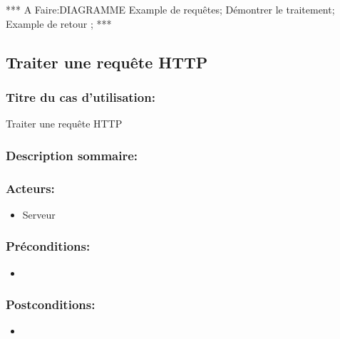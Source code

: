 \documentclass{scrreprt}
\begin{document}
*** A Faire:DIAGRAMME
Example de requêtes;
Démontrer le traitement;
Example de retour ;
***

\subsection{Traiter une requête HTTP}
\subsubsection{Titre du cas d'utilisation:} Traiter une requête HTTP
\subsubsection{Description sommaire:} 
\subsubsection{Acteurs:}
\begin{itemize}
    \item Serveur
\end{itemize}
\subsubsection{Préconditions:}
\begin{itemize}
    \item  
\end{itemize} 
\subsubsection{Postconditions:}
\begin{itemize}
    \item  
\end{itemize} 
\end{document}
